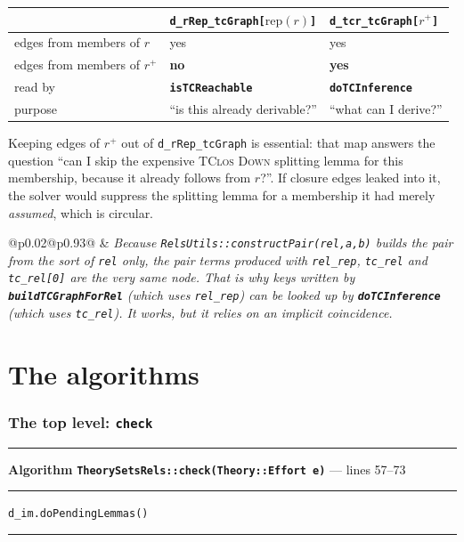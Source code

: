 \documentclass[11pt,a4paper]{article}
\makeatletter
\newenvironment{balgo}[1]{%
  \par\addvspace{\medskipamount}\noindent
  \rule{\linewidth}{0.9pt}\par\nobreak\vspace{1pt}%
  \refstepcounter{algorithm}%
  \noindent\textbf{Algorithm \thealgorithm}\quad #1\par\nobreak\vspace{1pt}%
  \noindent\rule{\linewidth}{0.4pt}\par\nobreak\vspace{-2pt}%
}{%
  \par\nobreak\vspace{1pt}\noindent\rule{\linewidth}{0.9pt}%
  \par\addvspace{\medskipamount}%
}
\newcommand{\code}[1]{\texttt{\small #1}}
\newcommand{\fn}[1]{\texttt{\small\bfseries #1}}
\newcommand{\tc}[1]{{#1}^{+}}
\newcommand{\rep}[1]{\mathrm{rep}(#1)}
\theoremstyle{definition}
\newenvironment{sidenote}
  {\par\medskip\noindent\begin{tabular}{@{}p{0.02\textwidth}@{\hspace{4pt}}p{0.93\textwidth}@{}}
   \raisebox{-1pt}{\color{hl}\Large$\vartriangleright$} &\itshape}
  {\end{tabular}\par\medskip}
\makeatother
\begin{document}
\begin{center}\small
\begin{tabular}{@{}lll@{}}
\toprule
 & \code{d\_rRep\_tcGraph[$\rep{r}$]} & \code{d\_tcr\_tcGraph[$\tc{r}$]}\\
\midrule
edges from members of $r$      & yes & yes\\
edges from members of $\tc{r}$ & \textbf{no} & \textbf{yes}\\
read by                        & \fn{isTCReachable} & \fn{doTCInference}\\
purpose & ``is this already derivable?'' & ``what can I derive?''\\
\bottomrule
\end{tabular}
\end{center}

\noindent
Keeping edges of $\tc{r}$ out of \code{d\_rRep\_tcGraph} is essential: that map
answers the question ``can I skip the expensive \textsc{TClos Down} splitting
lemma for this membership, because it already follows from $r$?''. If closure
edges leaked into it, the solver would suppress the splitting lemma for a
membership it had merely \emph{assumed}, which is circular.

\begin{sidenote}
Because \code{RelsUtils::constructPair(rel,a,b)} builds the pair from the
\emph{sort} of \code{rel} only, the pair terms produced with \code{rel\_rep},
\code{tc\_rel} and \code{tc\_rel[0]} are the very same node. That is why keys
written by \fn{buildTCGraphForRel} (which uses \code{rel\_rep}) can be looked up
by \fn{doTCInference} (which uses \code{tc\_rel}). It works, but it relies on an
implicit coincidence.
\end{sidenote}

\part{The algorithms}\label{part:algo}

\section{The top level: \fn{check}}

\begin{balgo}{\fn{TheorySetsRels::check(Theory::Effort e)} --- lines 57--73}
\begin{algorithmic}[1]
 \State \Return {}
\EndIf
\State {} 
\State {} 
\State \code{d\_im.doPendingLemmas()} 
\end{algorithmic}
\end{balgo}
\end{document}
